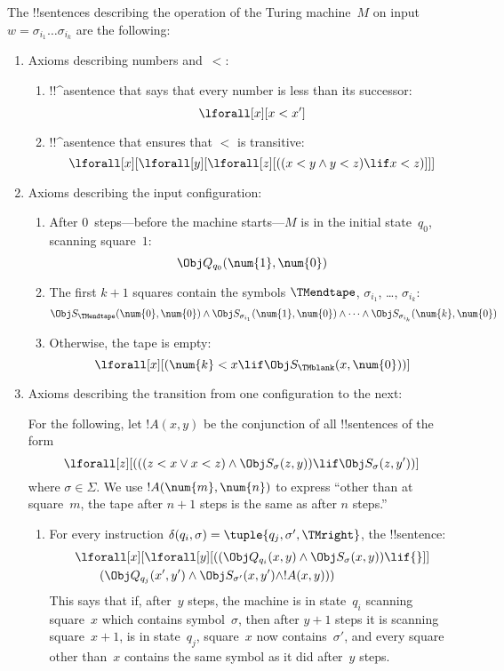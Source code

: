 \documentclass[../../../include/open-logic-section]{subfiles}
\begin{document}
The !!{sentence}s describing the operation of the Turing machine~$M$ on
input $w = \sigma_{i_1}\dots\sigma_{i_k}$ are the following:
\begin{enumerate}
\item Axioms describing numbers and~$<$:
\begin{enumerate}
\item !!^a{sentence} that says that every number is less than its successor:
\[
\lforall[x][x < x']
\]
\item !!^a{sentence} that ensures that $<$ is transitive:
\[
\lforall[x][\lforall[y][\lforall[z][
      ((x < y \land y < z) \lif x < z)]]]
\]
\end{enumerate}
\item Axioms describing the input configuration:
\begin{enumerate}
\item After $0$~steps---before the machine starts---$M$ is in
  the initial state~$q_0$, scanning square~$1$:
\[
\Obj Q_{q_0}(\num{1}, \num{0})
\]
\item The first $k+1$ squares contain the symbols $\TMendtape$,
  $\sigma_{i_1}$, \dots, $\sigma_{i_k}$:
\[
\Obj S_\TMendtape(\num{0}, \num{0}) \land
\Obj S_{\sigma_{i_1}}(\num{1}, \num{0}) \land
\dots \land
\Obj S_{\sigma_{i_k}}(\num{k}, \num{0})
\]
\item Otherwise, the tape is empty:
\[
\lforall[x][(\num{k} < x \lif \Obj S_\TMblank(x, \num{0}))]
\]
\end{enumerate}
\item Axioms describing the transition from one configuration to
  the next:

For the following, let $!A(x, y)$ be the conjunction of all !!{sentence}s
of the form
\[
\lforall[z][
  (((z < x \lor x < z) \land \Obj S_\sigma(z, y))
  \lif \Obj S_\sigma(z, y'))]
\]
where $\sigma \in \Sigma$.  We use $!A(\num{m},\num{n})$ to express
``other than at square~$m$, the tape after $n+1$ steps is the same as
after $n$ steps.''
\begin{enumerate}
\item {} For every instruction $\delta(q_i, \sigma) =
  \tuple{q_j, \sigma', \TMright}$, the !!{sentence}:
\begin{align*}
& \lforall[x][\lforall[y][(
   (\Obj Q_{q_i}(x, y) \land \Obj S_{\sigma}(x, y)) \lif {}]] \\
&\qquad   (\Obj Q_{q_j}(x', y') \land \Obj S_{\sigma'}(x, y') \land
!A(x, y)))
\end{align*}
This says that if, after~$y$ steps, the machine is in state~$q_i$
scanning square~$x$ which contains symbol~$\sigma$, then after $y+1$
steps it is scanning square~$x+1$, is in state~$q_j$, square~$x$ now
contains~$\sigma'$, and every square other than~$x$ contains the
same symbol as it did after~$y$ steps.


\end{enumerate}
\end{enumerate}
\end{document}
